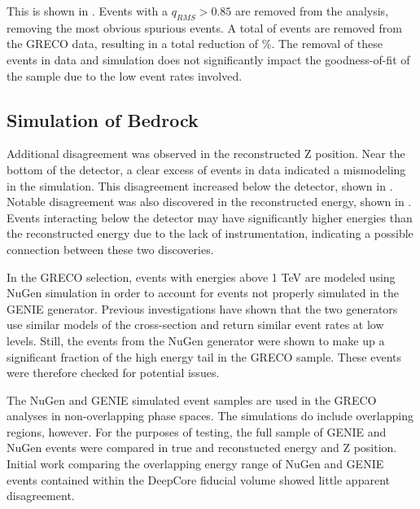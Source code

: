 This is shown in .
Events with a ${q_{RMS}}>0.85$ are removed from the analysis, removing the most obvious spurious events. 
A total of  events are removed from the GRECO data, resulting in a total reduction of \%.
The removal of these events in data and simulation does not significantly impact the goodness-of-fit of the sample due to the low event rates involved.

\label{subsec:bedrock}
\subsection{Simulation of Bedrock}
Additional disagreement was observed in the reconstructed Z position.
Near the bottom of the detector, a clear excess of events in data indicated a mismodeling in the simulation.
This disagreement increased below the detector, shown in .
Notable disagreement was also discovered in the reconstructed energy, shown in .
Events interacting below the detector may have significantly higher energies than the reconstructed energy due to the lack of instrumentation, indicating a possible connection between these two discoveries.

In the GRECO selection, events with energies above 1 TeV are modeled using NuGen simulation in order to account for events not properly simulated in the GENIE generator.
Previous investigations have shown that the two generators use similar models of the cross-section and return similar event rates at low levels.
Still, the events from the NuGen generator were shown to make up a significant fraction of the high energy tail in the GRECO sample.
These events were therefore checked for potential issues.

The NuGen and GENIE simulated event samples are used in the GRECO analyses in non-overlapping phase spaces.
The simulations do include overlapping regions, however.
For the purposes of testing, the full sample of GENIE and NuGen events were compared in true and reconstucted energy and Z position.
Initial work comparing the overlapping energy range of NuGen and GENIE events contained within the DeepCore fiducial volume showed little apparent disagreement.

